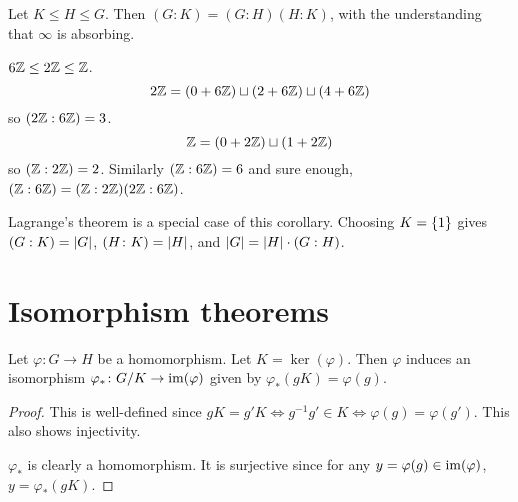 \begin{corollary*} \label{thm:index:mult}
    Let $K \le H \le G$.
    Then $(G : K) = (G : H)(H : K)$,
    with the understanding that $\infty$ is absorbing.
\end{corollary*}
\begin{example}
    $6\mathbb{Z} \le 2\mathbb{Z} \le \mathbb{Z}$.
    \[
        2\mathbb{Z} = (0 + 6\mathbb{Z}) \sqcup (2 + 6\mathbb{Z}) \sqcup (4 + 6\mathbb{Z})
    \] so $(2\mathbb{Z} : 6\mathbb{Z}) = 3$.
    \[
        \mathbb{Z} = (0 + 2\mathbb{Z}) \sqcup (1 + 2\mathbb{Z})
    \] so $(\mathbb{Z} : 2\mathbb{Z}) = 2$.
    Similarly $(\mathbb{Z} : 6\mathbb{Z}) = 6$
    and sure enough, $(\mathbb{Z} : 6\mathbb{Z}) = (\mathbb{Z} : 2\mathbb{Z})(2\mathbb{Z} : 6\mathbb{Z})$.
\end{example}
Lagrange's theorem is a special case of this corollary.
Choosing $K = \{1\}$ gives $(G : K) = \lvert G\rvert$, $(H \colon K) = \lvert H\rvert$,
and $\lvert G\rvert = \lvert H\rvert \cdot (G : H)$.

\section{Isomorphism theorems} \label{sec:iso-thm}
\begin{theorem*} \label{thm:iso:1}
    Let $\varphi\colon G \to H$ be a homomorphism.
    Let $K = \ker(\varphi)$.
    Then $\varphi$ induces an isomorphism
    $\varphi_*\colon G/K \to \operatorname{im}(\varphi)$
    given by $\varphi_*(gK) = \varphi(g)$.
\end{theorem*}
\begin{proof}
    This is well-defined since
    $gK = g'K \iff g^{-1}g' \in K \iff \varphi(g) = \varphi(g')$.
    This also shows injectivity.

    $\varphi_*$ is clearly a homomorphism.
    It is surjective since for any $y = \varphi(g) \in \operatorname{im}(\varphi)$,
    $y = \varphi_*(gK)$.
\end{proof}

